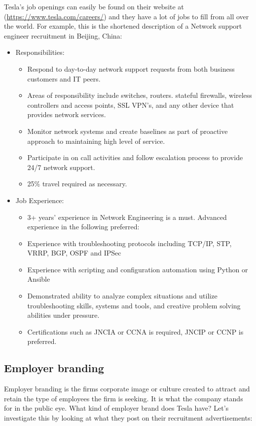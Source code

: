 \documentclass[12pt]{article}
\begin{document}
Tesla's job openings can easily be found on their website at (\url{https://www.tesla.com/careers/}) and they have a lot of jobs to fill from all over the world. For example, this is the shortened description of a Network support engineer recruitment in Beijing, China:
{\itshape
\begin{itemize}
	\item{Responsibilities:}
	\begin{itemize}
		\item{Respond to day-to-day network support requests from both business customers and IT peers.}
		\item{Areas of responsibility include switches, routers. stateful firewalls, wireless controllers and access points, SSL VPN's, and any other device that provides network services.}
		\item{Monitor network systems and create baselines as part of proactive approach to maintaining high level of service.}
		\item{Participate in on call activities and follow escalation process to provide 24/7 network support.}
		\item{25\% travel required as necessary.}
	\end{itemize}
	\item{Job Experience:}
	\begin{itemize}
		\item{3+ years' experience in Network Engineering is a must. Advanced experience in the following preferred:}
		\item{Experience with troubleshooting protocols including TCP/IP, STP, VRRP, BGP, OSPF and IPSec}
		\item{Experience with scripting and configuration automation using Python or Ansible}
		\item{Demonstrated ability to analyze complex situations and utilize troubleshooting skills, systems and tools, and creative problem solving abilities under pressure.}
		\item{Certifications such as JNCIA or CCNA is required, JNCIP or CCNP is preferred.}
	\end{itemize}
\end{itemize}
}

\subsection{Employer branding}

Employer branding is the firms corporate image or culture created to attract and retain the type of employees the firm is seeking. It is what the company stands for in the public eye. What kind of employer brand does Tesla have? Let's investigate this by looking at what they post on their recruitment advertisements:
\end{document}

